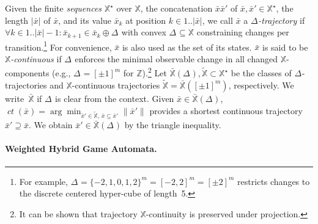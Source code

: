 \documentclass{article}
\newcommand\mNjOrhQ[1][]{#1^{\star}}
\newcommand\majimMG[1]{|#1|}
\def\norm#1{\lVert#1\rVert}
\newcommand\mBuHESu[1][\delta]{\Delta_{#1}}
\newcommand\mQtakuY[1][x]{\bar{#1}}
\begin{document}
{Given the finite \emph{sequences} $\mNjOrhQ[{\mathbb{X}}]$ over
${\mathbb{X}}$, the concatenation $\mQtakuY\mQtakuY'$ of
$\mQtakuY,\mQtakuY'\in\mNjOrhQ[{\mathbb{X}}]$, the length $\majimMG\mQtakuY$ of
$\mQtakuY$, and its value $\mQtakuY_k$ at position
$k\in1..\majimMG\mQtakuY$,
we call $\mQtakuY$ a \emph{$\mBuHESu[]$-trajectory} if
$\forall k\in1..\majimMG\mQtakuY-1\colon \mQtakuY_{k+1}\in\mQtakuY_k\oplus
\mBuHESu[]$ with convex
$\mBuHESu[]\subseteq{\mathbb{X}}$ constraining changes per
transition.\footnote{For example,
  $\mBuHESu[]=\{-2,1,0,1,2\}^m=[-2,2]^m=[\pm 2]^m$ restricts changes to
  the discrete centered hyper-cube of length~5.}  For convenience,
$\mQtakuY$ is also used as the set of its states.  $\mQtakuY$ is said to
be \emph{${\mathbb{X}}$-continuous} 
if $\mBuHESu[]$ enforces the minimal observable change in all changed
${\mathbb{X}}$-components (e.g., $\mBuHESu[]=[\pm1]^m$ for
$\ensuremath{\mathbb{Z}}$).\footnote{It can be shown that trajectory
  ${\mathbb{X}}$-continuity is preserved under
  projection.} 
Let $\bar{\mathbb{X}}(\mBuHESu[]),\tilde{\mathbb{X}}\subset\mNjOrhQ[{\mathbb{X}}]$
be the classes of $\mBuHESu[]$-trajectories and ${\mathbb{X}}$-continuous
trajectories $\tilde{\mathbb{X}}=\bar{\mathbb{X}}([\pm 1]^m)$, respectively.
We write~$\bar{\mathbb{X}}$ if $\mBuHESu[]$ is clear from the context.
Given $\mQtakuY\in\bar{\mathbb{X}}(\mBuHESu[])$,
$\mathop\mathit{ct}(\mQtakuY) =
\arg\min_{\mQtakuY'\in\tilde{\mathbb{X}},\,\mQtakuY\subseteq\mQtakuY'}\norm{\mQtakuY'}$
provides a shortest continuous trajectory $\mQtakuY'\supseteq\mQtakuY$.
We obtain $\mQtakuY'\in\bar{\mathbb{X}}(\mBuHESu[])$ by the triangle
inequality. 

\paragraph{Weighted Hybrid Game Automata.}

}
\end{document}
